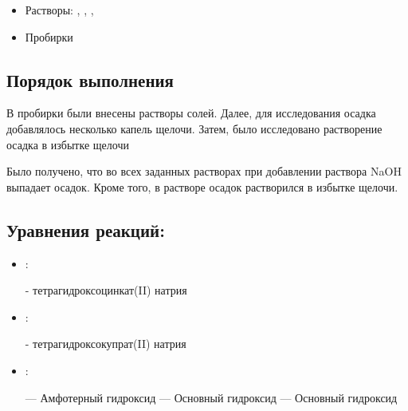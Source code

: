 \documentclass[a4paper, 12pt]{article}
\begin{document}
\begin{itemize}
	\item Растворы: , , , 
	
	\item Пробирки
\end{itemize}

\subsection{Порядок выполнения}

В пробирки были внесены растворы солей. Далее, для исследования осадка добавлялось несколько капель щелочи. Затем, было исследовано растворение осадка в избытке щелочи

Было получено, что во всех заданных растворах при добавлении раствора NaOH выпадает осадок. Кроме того, в растворе  осадок растворился в избытке щелочи.

\subsection{Уравнения реакций:}

\begin{itemize}
	\item {}:
	
	
	 - тетрагидроксоцинкат(II) натрия
	
	\item {}:
	
	
	 - тетрагидроксокупрат(II) натрия
	
	\item {}:
	
	
	 --- Амфотерный гидроксид
	 --- Основный гидроксид
	 --- Основный гидроксид
	
\end{itemize}
\end{document}
